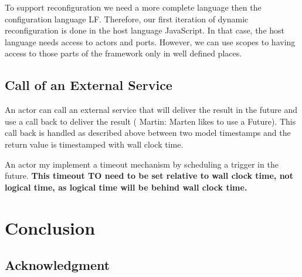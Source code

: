 \documentclass[sigconf]{acmart}
\newcommand{\martin}[1]{{\color{blue} Martin: #1}}
\begin{document}
To support reconfiguration we need a more complete language then the configuration
language LF. Therefore, our first iteration of dynamic reconfiguration is done in the
host language JavaScript. In that case, the host language needs access to actors and
ports. However, we can use scopes to having access to those parts of the framework
only in well defined places.

\subsection{Call of an External Service}

An actor can call an external service that will deliver the result in the future
and use a call back to deliver the result (\martin{Marten likes to use a Future}).
This call back is handled as described above between two model timestamps
and the return value is timestamped with wall clock time.

An actor my implement a timeout mechanism by scheduling a trigger in the future.
{\bf This timeout TO need to be set relative to wall clock time, not logical
time, as logical time will be behind wall clock time.}



\section{Conclusion}
\label{sec:conclusion}


\subsection*{Acknowledgment}



 
\end{document}
